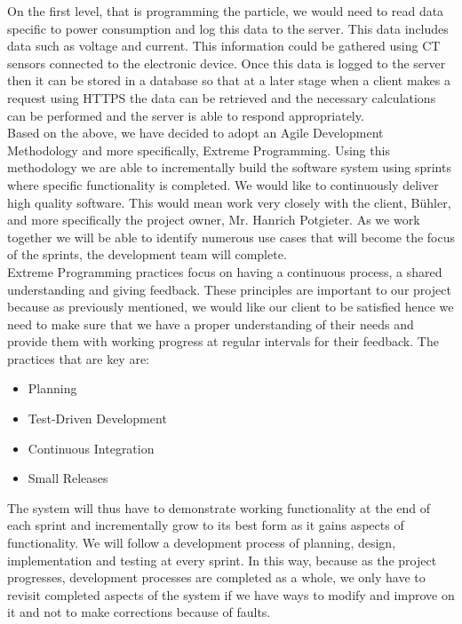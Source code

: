 \documentclass[a4paper,12pt]{article}
\begin{document}
On the first level, that is programming the particle, we would need to read data specific to power consumption and log this data to the server. This data includes data such as voltage and current. This information could be gathered using CT sensors connected to the electronic device. Once this data is logged to the server then it can be stored in a database so that at a later stage when a client makes a request using HTTPS the data can be retrieved and the necessary calculations can be performed and the server is able to respond appropriately. \\

Based on the above, we have decided to adopt an Agile Development Methodology and more specifically, Extreme Programming. Using this methodology we are able to incrementally build the software system using sprints where specific functionality is completed. We would like to continuously deliver high quality software. This would mean work very closely with the client, B{\"u}hler, and more specifically the project owner, Mr. Hanrich Potgieter. As we work together we will be able to identify numerous use cases that will become the focus of the sprints, the development team will complete. \\

Extreme Programming practices focus on having a continuous process, a shared understanding and giving feedback. These principles are important to our project because as previously mentioned, we would like our client to be satisfied hence we need to make sure that we have a proper understanding of their needs and provide them with working progress at regular intervals for their feedback. The practices that are key are:
\begin{itemize}
\item Planning
\item Test-Driven Development
\item Continuous Integration
\item Small Releases
\end{itemize}
The system will thus have to demonstrate working functionality at the end of each sprint and incrementally grow to its best form as it gains aspects of functionality. We will follow a development process of planning, design, implementation and testing at every sprint. In this way, because as the project progresses, development processes are completed as a whole, we only have to revisit completed aspects of the system if we have ways to modify and improve on it and not to make corrections because of faults.\\
\end{document}
